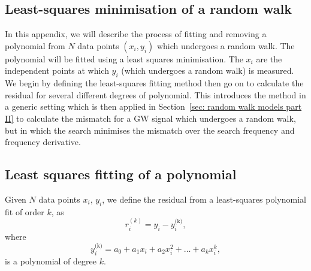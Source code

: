 \documentclass[../full_thesis/full_thesis.tex]{subfiles}
\begin{document}
\begin{subappendices}
\section{Least-squares minimisation of a random walk}
\label{sec: least squares minimisation of a random walk}
In this appendix, we will describe the process of fitting and
removing a polynomial from $N$ data points $(x_i, y_i)$ which undergoes a
random walk. The polynomial will be fitted using a least squares minimisation.
The $x_i$ are the independent points at which $y_i$ (which undergoes a random
walk) is measured. We begin by defining the least-squares fitting method then
go on to calculate the residual for several different degrees of polynomial.
This introduces the method in a generic setting which is then applied in
Section~\ref{sec: random walk models part II} to calculate the mismatch for a
GW signal which undergoes a random walk, but in which the search minimises the
mismatch over the search frequency and frequency derivative.

\subsection{Least squares fitting of a polynomial}
Given $N$ data points $x_{i}$, $y_{i}$, we define the residual from a least-squares
polynomial fit of order $k$, as
\begin{equation}
    r_i^{(k)} = y_{i} - y^{\textrm{(k)}}_{i},
\end{equation}
where
\begin{equation}
y^{\textrm{(k)}}_{i} = a_{0} + a_{1}x_{i} + a_{2}x_{i}^{2} + \dots
                                                           + a_{k} x_{i}^{k},
\end{equation}
is a polynomial of degree $k$.


\end{subappendices}
\end{document}
